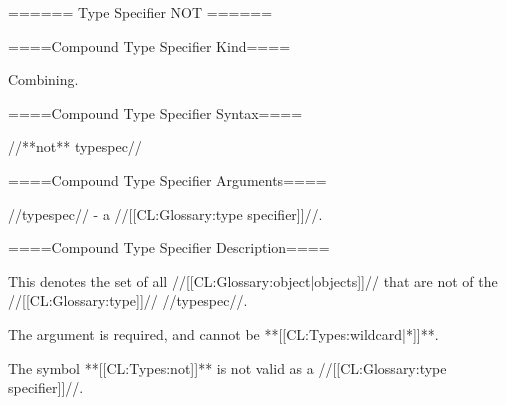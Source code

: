====== Type Specifier NOT ======

====Compound Type Specifier Kind====

Combining.

====Compound Type Specifier Syntax====

//**not** typespec//

====Compound Type Specifier Arguments====

//typespec// - a //[[CL:Glossary:type specifier]]//.

====Compound Type Specifier Description====

This denotes the set of all //[[CL:Glossary:object|objects]]// that are not of the //[[CL:Glossary:type]]// //typespec//.

The argument is required, and cannot be **[[CL:Types:wildcard|*]]**.

The symbol **[[CL:Types:not]]** is not valid as a //[[CL:Glossary:type specifier]]//.

